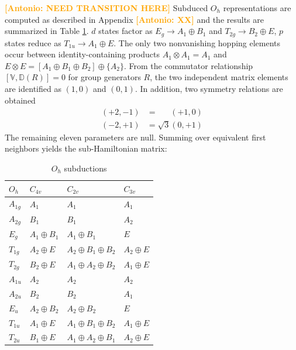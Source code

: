 \documentclass[twocolumn,showpacs,preprintnumbers,superscriptaddress,prb,floatfix,aps,10pt]{revtex4-1}
\newcommand{\abmei}[1]{\textcolor{orange}{ \bf [Antonio: #1] }}
\newcommand*{\wignerD}{\mathbb{D}(R)}
\begin{document}
\abmei{NEED TRANSITION HERE}
Subduced $O_h$ representations are computed as described in Appendix \abmei{XX} and the results are summarized in Table \ref{table:subduction}. $d$ states factor as $E_g \rightarrow A_1 \oplus B_1$ and $T_{2g} \rightarrow B_2 \oplus E$, $p$ states reduce as $T_{1u} \rightarrow A_1 \oplus E$. The only two nonvanishing hopping elements occur between identity-containing products $A_1 \otimes A_1 = A_1$ and $E \otimes E = [ A_1 \oplus B_1 \oplus B_2 ] \oplus \{ A_2 \} $. From the commutator relationship $[\mathbb{V},\wignerD] = 0$ for group generators $R$, the two independent matrix elements are identified as $( 1, 0)$ and $( 0, 1)$. In addition, two symmetry relations are obtained 
\begin{align}
     (+2,-1) &= \phantom{\sqrt{3}} (+1, 0) \\
     (-2,+1) &=          \sqrt{3}  ( 0,+1)
\end{align}
The remaining eleven parameters are null. Summing over equivalent first neighbors yields the sub-Hamiltonian matrix:
%
\begin{table}
\caption{\label{table:subduction} $O_h$ subductions}
\begin{ruledtabular}
\begin{tabular*}{10cm}{llll}
$O_h$    & $C_{4v}$         & $C_{2v}$                              &   $C_{3v}$            \\ \hline
$A_{1g}$ & $A_1$            & $A_{1}$                               &   $A_1$               \\ 
$A_{2g}$ & $B_1$            & $B_{1}$                               &   $A_2$               \\ 
$E_g   $ & $A_1 \oplus B_1$ & $A_{1} \oplus B_{1}$                  &   $E$                 \\ 
$T_{1g}$ & $A_2 \oplus E$   & $A_{2} \oplus B_{1} \oplus B_{2}$     &   $A_2 \oplus E$      \\ 
$T_{2g}$ & $B_2 \oplus E$   & $A_{1} \oplus A_{2} \oplus B_{2}$     &   $A_1 \oplus E$      \\ 
$A_{1u}$ & $A_2$            & $A_{2}$                               &   $A_2$               \\ 
$A_{2u}$ & $B_2$            & $B_{2}$                               &   $A_1$               \\ 
$E_u   $ & $A_2 \oplus B_2$ & $A_{2} \oplus B_{2}$                  &   $E$                 \\ 
$T_{1u}$ & $A_1 \oplus E$   & $A_{1} \oplus B_{1} \oplus B_{2}$     &   $A_1 \oplus E$      \\ 
$T_{2u}$ & $B_1 \oplus E$   & $A_{1} \oplus A_{2} \oplus B_{1}$     &   $A_2 \oplus E$      \\ 
\end{tabular*}
\end{ruledtabular}
\end{table}
\end{document}
